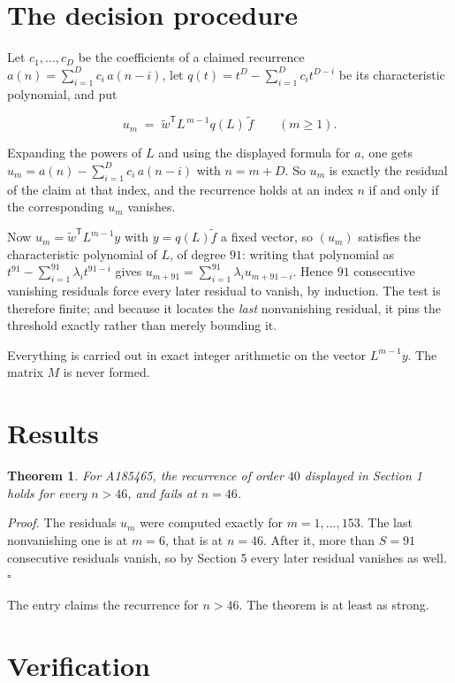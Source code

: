 \documentclass[11pt]{article}
\newtheorem{theorem}{Theorem}
\theoremstyle{definition}
\begin{document}
\section{The decision procedure}

Let $c_1,\dots,c_D$ be the coefficients of a claimed recurrence $a(n) = \sum_{i=1}^{D} c_i\,a(n-i)$, let $q(t) = t^{D} - \sum_{i=1}^{D} c_i t^{D-i}$ be its characteristic polynomial, and put

\[u_m \;=\; \tilde w^{\mathsf T} L^{\,m-1} q(L)\,\tilde f \qquad (m \ge 1).\]

Expanding the powers of $L$ and using the displayed formula for $a$, one gets $u_m = a(n) - \sum_{i=1}^{D} c_i\,a(n-i)$ with $n = m + D$. So $u_m$ is exactly the residual of the claim at that index, and the recurrence holds at an index $n$ if and only if the corresponding $u_m$ vanishes.

Now $u_m = \tilde w^{\mathsf T} L^{m-1} y$ with $y = q(L)\tilde f$ a fixed vector, so $(u_m)$ satisfies the characteristic polynomial of $L$, of degree $91$: writing that polynomial as $t^{91} - \sum_{i=1}^{91} \lambda_i t^{91-i}$ gives $u_{m+91} = \sum_{i=1}^{91} \lambda_i u_{m+91-i}$. Hence $91$ consecutive vanishing residuals force every later residual to vanish, by induction. The test is therefore finite; and because it locates the {\itshape last} nonvanishing residual, it pins the threshold exactly rather than merely bounding it.

Everything is carried out in exact integer arithmetic on the vector $L^{m-1}y$. The matrix $M$ is never formed.

\section{Results}

\begin{theorem} For A185465, the recurrence of order $40$ displayed in Section 1 holds for every $n > 46$, and fails at $n = 46$.\end{theorem}

{\itshape Proof.} The residuals $u_m$ were computed exactly for $m = 1,\dots,153$. The last nonvanishing one is at $m = 6$, that is at $n = 46$. After it, more than $S = 91$ consecutive residuals vanish, so by Section 5 every later residual vanishes as well. $\square$

The entry claims the recurrence for $n > 46$. The theorem is at least as strong.

\section{Verification}
\end{document}
